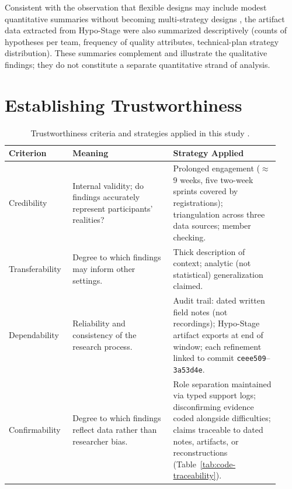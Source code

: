Consistent with the observation that flexible designs may
include modest quantitative summaries without becoming multi-strategy
designs \citep{robson2016}, the artifact data extracted from Hypo-Stage were also summarized
descriptively (counts of hypotheses per team, frequency of quality
attributes, technical-plan strategy distribution). These summaries
complement and illustrate the qualitative findings; they do not constitute
a separate quantitative strand of analysis.

\section{Establishing Trustworthiness}
\label{sec:trustworthiness}

\begin{table}[htbp]
\centering
\caption{Trustworthiness criteria and strategies applied in this study \citep{robson2016}.}
\label{tab:trustworthiness}
\begin{tabular}{p{0.20\linewidth} p{0.35\linewidth} p{0.37\linewidth}}
\toprule
\textbf{Criterion} & \textbf{Meaning} & \textbf{Strategy Applied} \\
\midrule
Credibility & Internal validity; do findings accurately represent participants' realities? & Prolonged engagement ($\approx$9 weeks, five two-week sprints covered by registrations); triangulation across three data sources; member checking. \\
\midrule
Transferability & Degree to which findings may inform other settings. & Thick description of context; analytic (not statistical) generalization claimed. \\
\midrule
Dependability & Reliability and consistency of the research process. & Audit trail: dated written field notes (not recordings); Hypo-Stage artifact exports at end of window; each refinement linked to commit \texttt{ceee509}--\texttt{3a53d4e}. \\
\midrule
Confirmability & Degree to which findings reflect data rather than researcher bias. & Role separation maintained via typed support logs; disconfirming evidence coded alongside difficulties; claims traceable to dated notes, artifacts, or reconstructions (Table~\ref{tab:code-traceability}). \\
\bottomrule
\end{tabular}
\end{table}

